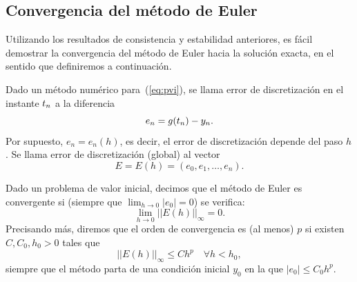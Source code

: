 \subsection{Convergencia del método de Euler}
\label{sec:convergencia-euler}

Utilizando los resultados de consistencia y estabilidad anteriores, es
fácil demostrar la convergencia del método de Euler hacia la solución
exacta, en el sentido que definiremos a continuación.

\begin{definition}
  \label{def:error-discretizacion-pvi}
  Dado un método numérico para~(\ref{eq:pvi}), se llama error de
  discretización en el instante ${t_n}$ a la diferencia
  \begin{equation*}
    e_n = g({t_n})-{y_n}.
  \end{equation*}
  Por supuesto, $e_n=e_n(h)$, es decir, el error de discretización
  depende del paso $h$. Se llama error de discretización (global) al
  vector
  \begin{equation*}
    E = E(h) = (e_0,e_1,\dots,e_n).
  \end{equation*}
\end{definition}
\begin{definition}
  \label{def:convergencia-euler}
  Dado un problema de valor inicial, decimos que el método de Euler es
  convergente si (siempre que $\lim_{h\to 0} |e_0|=0$) se verifica:
  \begin{equation*}
    \lim_{h\to 0} ||E(h)||_\infty = 0.
  \end{equation*}
  Precisando más, diremos que el orden de convergencia es (al menos)
  $p$ si existen $C, C_0, h_0>0$ tales que
  \begin{equation*}
    ||E(h)||_\infty \le C h^p \quad \forall h<h_0,
  \end{equation*}
  siempre que el método parta de una condición inicial $y_0$ en la que
  $|e_0|\le C_0 h^p$.
\end{definition}

